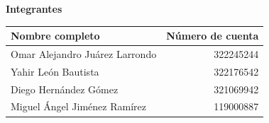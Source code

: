 \begin{titlepage}
    \begin{tcolorbox}[colback=white,colframe=unamgold,width=.82\textwidth,
      arc=2mm,boxrule=1pt]
      \centering
      {\large\textbf{Integrantes}\par}\vspace{0.25cm}
      \begin{tabular}{lr}
        \textbf{Nombre completo} & \textbf{Número de cuenta} \\
        \midrule
        Omar Alejandro Juárez Larrondo & 322245244 \\
        Yahir León Bautista & 322176542 \\
        Diego Hernández Gómez & 321069942 \\
        Miguel Ángel Jiménez Ramírez & 119000887
      \end{tabular}
    \end{tcolorbox}

    \vfill
\end{titlepage}
